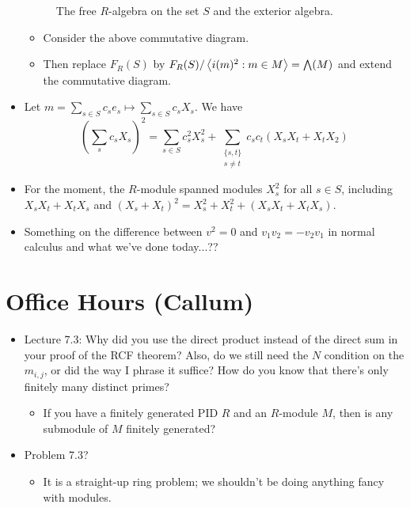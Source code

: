 \documentclass[../notes.tex]{subfiles}
\begin{document}
\begin{itemize}
\begin{figure}[H]
        \caption{The free $R$-algebra on the set $S$ and the exterior algebra.}
        \label{fig:FRSexAlg}
    \end{figure}
    \begin{itemize}
        \item Consider the above commutative diagram.
        \item Then replace $F_R(S)$ by $F_R(S)/\left\langle{i(m)^2:m\in M}\right\rangle=\bigwedge(M)$ and extend the commutative diagram.
    \end{itemize}
    \item Let $m=\sum_{s\in S}c_se_s\mapsto\sum_{s\in S}c_sX_s$. We have
    \begin{equation*}
        \left( \sum_sc_sX_s \right)^2 = \sum_{s\in S}c_s^2X_s^2+\sum_{\substack{\{s,t\}\\s\neq t}}c_sc_t(X_sX_t+X_tX_2)
    \end{equation*}
    \item For the moment, the $R$-module spanned modules $X_s^2$ for all $s\in S$, including $X_sX_t+X_tX_s$ and $(X_s+X_t)^2=X_s^2+X_t^2+(X_sX_t+X_tX_s)$.
    \item Something on the difference between $v^2=0$ and $v_1v_2=-v_2v_1$ in normal calculus and what we've done today...??
\end{itemize}



\section{Office Hours (Callum)}
\begin{itemize}
    \item Lecture 7.3: Why did you use the direct product instead of the direct sum in your proof of the RCF theorem? Also, do we still need the $N$ condition on the $m_{i,j}$, or did the way I phrase it suffice? How do you know that there's only finitely many distinct primes?
    \begin{itemize}
        \item If you have a finitely generated PID $R$ and an $R$-module $M$, then is any submodule of $M$ finitely generated?
    \end{itemize}
    \item Problem 7.3?
    \begin{itemize}
        \item It is a straight-up ring problem; we shouldn't be doing anything fancy with modules.
    \end{itemize}
\end{itemize}
\end{document}
